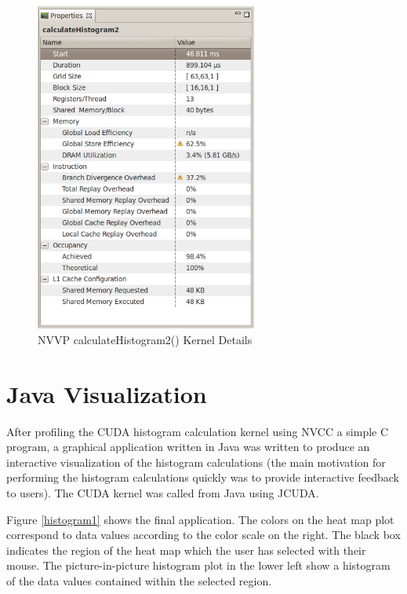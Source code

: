 \documentclass{article}
\begin{document}
\begin{figure}
\centering
\includegraphics[width=0.65\textwidth]{screenshots/nvvp/calculateHistogram2_screen3.png}
\caption{NVVP calculateHistogram2() Kernel Details}
\label{kernel2nvvp3}
\end{figure}

\section{Java Visualization}\label{visualization}

After profiling the CUDA histogram calculation kernel using NVCC a simple C program, a graphical application written in Java was written to produce an interactive visualization of the histogram calculations (the main motivation for performing the histogram calculations quickly was to provide interactive feedback to users). The CUDA kernel was called from Java using JCUDA\cite{jcuda}.

Figure \ref{histogram1} shows the final application. The colors on the heat map plot correspond to data values according to the color scale on the right. The black box indicates the region of the heat map which the user has selected with their mouse. The picture-in-picture histogram plot in the lower left show a histogram of the data values contained within the selected region.
\end{document}
